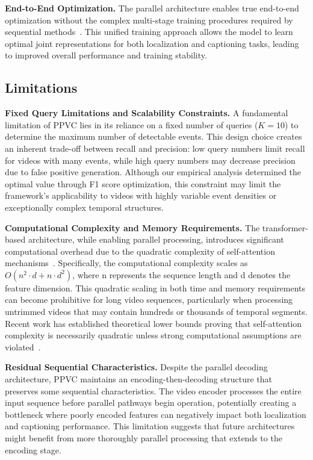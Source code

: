 \textbf{End-to-End Optimization.}
The parallel architecture enables true end-to-end optimization without the complex multi-stage training procedures required by sequential methods~\cite{Zhou2018-zu}. This unified training approach allows the model to learn optimal joint representations for both localization and captioning tasks, leading to improved overall performance and training stability.

\subsection{Limitations}
\textbf{Fixed Query Limitations and Scalability Constraints.}
A fundamental limitation of PPVC lies in its reliance on a fixed number of queries ($K=10$) to determine the maximum number of detectable events.
This design choice creates an inherent trade-off between recall and precision: low query numbers limit recall for videos with many events, while high query numbers may decrease precision due to false positive generation. Although our empirical analysis determined the optimal value through F1 score optimization, this constraint may limit the framework's applicability to videos with highly variable event densities or exceptionally complex temporal structures.

\textbf{Computational Complexity and Memory Requirements.}
The transformer-based architecture, while enabling parallel processing, introduces significant computational overhead due to the quadratic complexity of self-attention mechanisms~\cite{Vaswani2017-sc}. Specifically, the computational complexity scales as $O(n^2 \cdot d + n \cdot d^2)$, where n represents the sequence length and d denotes the feature dimension.
This quadratic scaling in both time and memory requirements can become prohibitive for long video sequences, particularly when processing untrimmed videos that may contain hundreds or thousands of temporal segments. Recent work has established theoretical lower bounds proving that self-attention complexity is necessarily quadratic unless strong computational assumptions are violated~\cite{duman2023computational}.

\textbf{Residual Sequential Characteristics.}
Despite the parallel decoding architecture, PPVC maintains an encoding-then-decoding structure that preserves some sequential characteristics. The video encoder processes the entire input sequence before parallel pathways begin operation, potentially creating a bottleneck where poorly encoded features can negatively impact both localization and captioning performance. This limitation suggests that future architectures might benefit from more thoroughly parallel processing that extends to the encoding stage.

